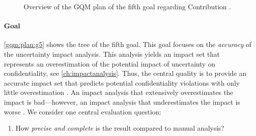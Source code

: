 \newcommand{\textGv}[0]{Validate the \emph{accuracy} of the impact set that represents the result of uncertainty impact analysis, i.e., the quality of the prediction of confidentiality violations.}
\newcommand{\textGvQi}[0]{How \emph{precise and complete} is the result compared to manual analysis?}
\newcommand{\textGvQiMi}[0]{$\precisionFormulaFull$}
\newcommand{\textGvQiMii}[0]{$\recallFormulaFull$}
\newcommand{\textGvQiMiii}[0]{$F_{1} = 2 \cdot \frac{\text{precision} \cdot \text{recall}}{\text{precision} + \text{recall}} \in [0,1]$}
\begin{figure}
    \centering
    \caption{Overview of the \ac*{GQM} plan of the fifth goal regarding Contribution .}
    \label{gqm:plan:g5}
\end{figure}

\paragraph{Goal }\label{gqm:text:g:5}
\autoref{gqm:plan:g5} shows the tree of the fifth goal.
This goal focuses on the \emph{accuracy} of the uncertainty impact analysis.
This analysis yields an impact set that represents an overestimation of the potential impact of uncertainty on confidentiality, see \autoref{ch:impactanalysis}.
Thus, the central quality is to provide an accurate impact set that predicts potential confidentiality violations with only little overestimation \cite{bohner_software_2002}.
An impact analysis that extensively overestimates the impact is bad---however, an impact analysis that underestimates the impact is worse \cite{hahner_architecture-based_2023}.
We consider one central evaluation question:

\begin{enumerate}[leftmargin=\GQMquestionsIndent]
  \item[\question{5}{1}] \textGvQi 
\end{enumerate}

